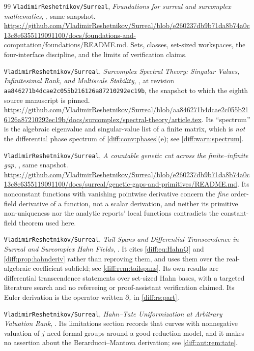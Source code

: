 \documentclass[11pt,letterpaper]{article}
\numberwithin{equation}{section}
\theoremstyle{definition}
\theoremstyle{remark}
\newcommand{\der}{\partial}
\newcommand{\Repo}{\texttt{VladimirReshetnikov/Surreal}}
\newcommand{\CommitB}{\nolinkurl{aa846271b4dcae2c055b216126a87210292ec19b}}
\newcommand{\derT}{\der_{\tau}}
\begin{document}
\begin{thebibliography}{99}
\Repo, \emph{Foundations for surreal and surcomplex mathematics},
, same snapshot.
\url{https://github.com/VladimirReshetnikov/Surreal/blob/e260237db9b71da8b74a0c13c8e6355119091100/docs/foundations-and-computation/foundations/README.md}.
Sets, classes, set-sized workspaces, the four-interface discipline, and the
limits of verification claims.

\Repo, \emph{Surcomplex Spectral Theory: Singular Values, Infinitesimal Rank,
and Multiscale Stability},
, at revision \CommitB, the snapshot to
which the eighth source manuscript is pinned.
\url{https://github.com/VladimirReshetnikov/Surreal/blob/aa846271b4dcae2c055b216126a87210292ec19b/docs/surcomplex/spectral-theory/article.tex}.
Its ``spectrum'' is the algebraic eigenvalue and singular-value list of a
finite matrix, which is \emph{not} the differential phase spectrum of
\cref{diff:conv:phases}(e); see \cref{diff:warn:spectrum}.

\Repo, \emph{A countable genetic cut across the finite--infinite gap},
, same snapshot.
\url{https://github.com/VladimirReshetnikov/Surreal/blob/e260237db9b71da8b74a0c13c8e6355119091100/docs/surreal/genetic-gaps-and-primitives/README.md}.
Its nonconstant functions with vanishing pointwise derivative concern the
\emph{fine} order-field derivative of a function, not a scalar derivation, and
neither its primitive non-uniqueness nor the analytic reports' local functions
contradicts the constant-field theorem used here.

\Repo, \emph{Tail-Spans and Differential Transcendence in Surreal and
Surcomplex Hahn Fields},
.
It cites \cref{diff:eq:HahnQ} and \cref{diff:prop:hahnderiv} rather than
reproving them, and uses them over the real-algebraic coefficient subfield;
see \cref{diff:rem:tailspans}. Its own results are differential
transcendence statements over set-sized Hahn bases, with a targeted
literature search and no refereeing or proof-assistant verification
claimed. Its Euler derivation is the operator written $\derT$ in
\cref{diff:rs:part}.

\Repo, \emph{Hahn--Tate Uniformization at Arbitrary Valuation Rank},
. Its limitations section records
that curves with nonnegative valuation of $j$ need formal groups around a
good-reduction model, and it makes no assertion about the Berarducci--Mantova
derivation; see \cref{diff:aut:rem:tate}.


\end{thebibliography}
\end{document}

